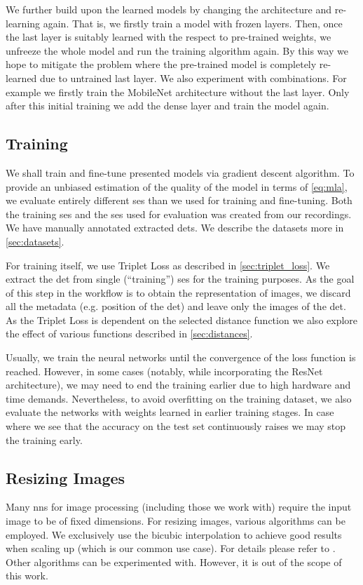 We further build upon the learned models by changing the architecture and re-learning again. That is, we firstly train a model with frozen layers. Then, once the last layer is suitably learned with the respect to pre-trained weights, we unfreeze the whole model and run the training algorithm again. By this way we hope to mitigate the problem where the pre-trained model is completely re-learned due to untrained last layer. We also experiment with combinations. For example we firstly train the MobileNet architecture without the last layer. Only after this initial training we add the dense layer and train the model again.

\subsection{Training}

We shall train and fine-tune presented models via gradient descent algorithm. To provide an unbiased estimation of the quality of the model in terms of \autoref{eq:mla}, we evaluate entirely different \gls{ses} than we used for training and fine-tuning. Both the training \gls{ses} and the \gls{ses} used for evaluation was created from our recordings. We have manually annotated extracted \glspl{det}. We describe the datasets more in \autoref{sec:datasets}.

For training itself, we use Triplet Loss as described in \autoref{sec:triplet_loss}. We extract the \gls{det} from single (``training'') \gls{ses} for the training purposes. As the goal of this step in the workflow is to obtain the representation of images, we discard all the metadata (e.g. position of the \gls{det}) and leave only the images of the \gls{det}. As the Triplet Loss is dependent on the selected distance function we also explore the effect of various functions described in \autoref{sec:distances}.

Usually, we train the neural networks until the convergence of the loss function is reached. However, in some cases (notably, while incorporating the ResNet architecture), we may need to end the training earlier due to high hardware and time demands. Nevertheless, to avoid overfitting on the training dataset, we also evaluate the networks with weights learned in earlier training stages. In case where we see that the accuracy on the test set continuously raises we may stop the training early.

\subsection{Resizing Images}

\label{ssec:resizing}

Many \glspl{nn} for image processing (including those we work with) require the input image to be of fixed dimensions. For resizing images, various algorithms can be employed. We exclusively use the bicubic interpolation to achieve good results when scaling up (which is our common use case). For details please refer to \cite{keys1981cubic}. Other algorithms can be experimented with. However, it is out of the scope of this work.